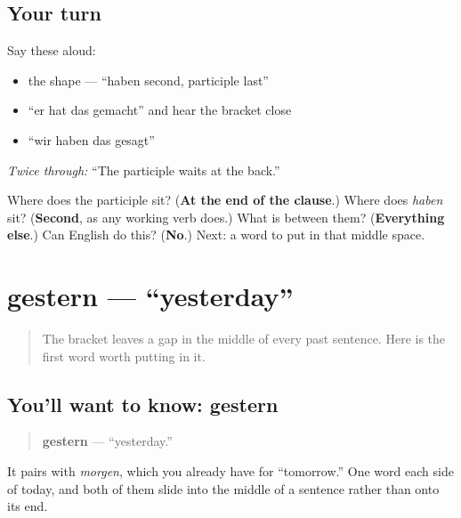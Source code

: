 \subsection*{Your turn}
Say these aloud:

\begin{itemize}
\raggedright
  \item the shape — \textquotedblleft{}haben second, participle last\textquotedblright{}
  \item \textquotedblleft{}er hat das gemacht\textquotedblright{} and hear the bracket close
  \item \textquotedblleft{}wir haben das gesagt\textquotedblright{}
\end{itemize}

\emph{Twice through:} \textquotedblleft{}The participle waits at the back.\textquotedblright{}

\begin{tcolorbox}[breakable,colback=teal!4,colframe=teal!35!black,title={Before you move on}]
Where does the participle sit? (\textbf{At the end of the clause}.) Where does \emph{haben} sit? (\textbf{Second}, as any working verb does.) What is between them? (\textbf{Everything else}.) Can English do this? (\textbf{No}.) Next: a word to put in that middle space.
\end{tcolorbox}
\section[gestern]{gestern — \textquotedblleft{}yesterday\textquotedblright{}}

\label{lesson:GE-C15-gestern}



\begin{quote}
The bracket leaves a gap in the middle of every past sentence. Here is the first word worth putting in it.
\end{quote}

\subsection*{You'll want to know: gestern}
\begin{quote}
\textbf{gestern} — \textquotedblleft{}yesterday.\textquotedblright{}
\end{quote}

It pairs with \emph{morgen}, which you already have for \textquotedblleft{}tomorrow.\textquotedblright{} One word each side of today, and both of them slide into the middle of a sentence rather than onto its end.

